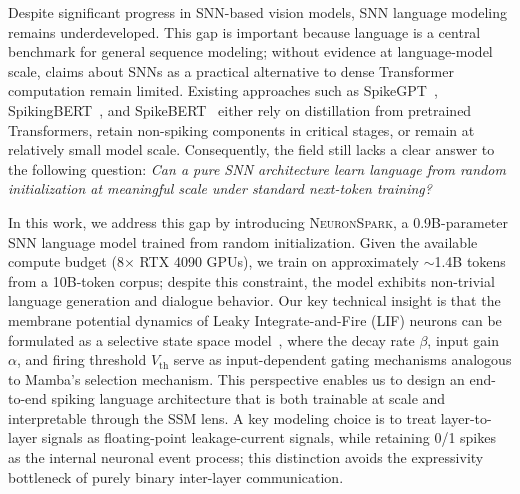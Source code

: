\documentclass{article}
\newcommand{\model}{\textsc{NeuronSpark}}
\newcommand{\vth}{V_{\text{th}}}
\begin{document}
Despite significant progress in SNN-based vision models, SNN language modeling remains underdeveloped.
This gap is important because language is a central benchmark for general sequence modeling; without evidence at language-model scale, claims about SNNs as a practical alternative to dense Transformer computation remain limited.
Existing approaches such as SpikeGPT~\citep{zhu2024spikegpt}, SpikingBERT~\citep{bal2024spikingbert}, and SpikeBERT~\citep{lv2023spikebert} either rely on distillation from pretrained Transformers, retain non-spiking components in critical stages, or remain at relatively small model scale.
Consequently, the field still lacks a clear answer to the following question: \emph{Can a pure SNN architecture learn language from random initialization at meaningful scale under standard next-token training?}

In this work, we address this gap by introducing \model{}, a 0.9B-parameter SNN language model trained from random initialization.
Given the available compute budget (8$\times$ RTX 4090 GPUs), we train on approximately $\sim$1.4B tokens from a 10B-token corpus; despite this constraint, the model exhibits non-trivial language generation and dialogue behavior.
Our key technical insight is that the membrane potential dynamics of Leaky Integrate-and-Fire (LIF) neurons can be formulated as a selective state space model~\citep{gu2024mamba}, where the decay rate $\beta$, input gain $\alpha$, and firing threshold $\vth$ serve as input-dependent gating mechanisms analogous to Mamba's selection mechanism.
This perspective enables us to design an end-to-end spiking language architecture that is both trainable at scale and interpretable through the SSM lens. A key modeling choice is to treat layer-to-layer signals as floating-point leakage-current signals, while retaining 0/1 spikes as the internal neuronal event process; this distinction avoids the expressivity bottleneck of purely binary inter-layer communication.
\end{document}
